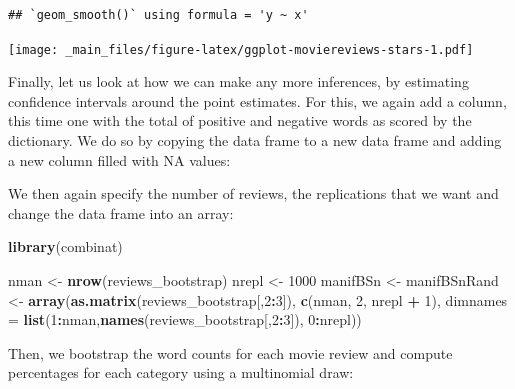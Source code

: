 \documentclass[
]{book}
\newenvironment{Shaded}{\begin{snugshade}}{\end{snugshade}}
\newcommand{\AttributeTok}[1]{\textcolor[rgb]{0.13,0.29,0.53}{#1}}
\newcommand{\ConstantTok}[1]{\textcolor[rgb]{0.56,0.35,0.01}{#1}}
\newcommand{\DecValTok}[1]{\textcolor[rgb]{0.00,0.00,0.81}{#1}}
\newcommand{\FunctionTok}[1]{\textcolor[rgb]{0.13,0.29,0.53}{\textbf{#1}}}
\newcommand{\NormalTok}[1]{#1}
\newcommand{\OtherTok}[1]{\textcolor[rgb]{0.56,0.35,0.01}{#1}}
\newcommand{\SpecialCharTok}[1]{\textcolor[rgb]{0.81,0.36,0.00}{\textbf{#1}}}
\begin{document}
\begin{verbatim}
## `geom_smooth()` using formula = 'y ~ x'
\end{verbatim}

\texttt{[image: \_main\_files/figure-latex/ggplot-moviereviews-stars-1.pdf]}

Finally, let us look at how we can make any more inferences, by estimating confidence intervals around the point estimates. For this, we again add a column, this time one with the total of positive and negative words as scored by the dictionary. We do so by copying the data frame to a new data frame and adding a new column filled with NA values:

\begin{Shaded}
\end{Shaded}

We then again specify the number of reviews, the replications that we want and change the data frame into an array:

\begin{Shaded}
\begin{Highlighting}[]
\FunctionTok{library}\NormalTok{(combinat)}

\NormalTok{nman }\OtherTok{\textless{}{-}} \FunctionTok{nrow}\NormalTok{(reviews\_bootstrap)}
\NormalTok{nrepl }\OtherTok{\textless{}{-}} \DecValTok{1000}
\NormalTok{manifBSn }\OtherTok{\textless{}{-}}\NormalTok{ manifBSnRand }\OtherTok{\textless{}{-}} \FunctionTok{array}\NormalTok{(}\FunctionTok{as.matrix}\NormalTok{(reviews\_bootstrap[,}\DecValTok{2}\SpecialCharTok{:}\DecValTok{3}\NormalTok{]),}
 \FunctionTok{c}\NormalTok{(nman, }\DecValTok{2}\NormalTok{, nrepl }\SpecialCharTok{+} \DecValTok{1}\NormalTok{), }
 \AttributeTok{dimnames =} \FunctionTok{list}\NormalTok{(}\DecValTok{1}\SpecialCharTok{:}\NormalTok{nman,}\FunctionTok{names}\NormalTok{(reviews\_bootstrap[,}\DecValTok{2}\SpecialCharTok{:}\DecValTok{3}\NormalTok{]), }
 \DecValTok{0}\SpecialCharTok{:}\NormalTok{nrepl))}
\end{Highlighting}
\end{Shaded}

Then, we bootstrap the word counts for each movie review and compute percentages for each category using a multinomial draw:
\end{document}
